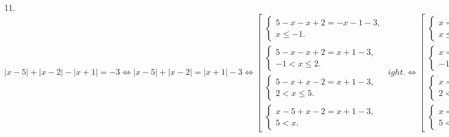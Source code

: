 11. $|x-5|+|x-2|-|x+1|=-3\Leftrightarrow |x-5|+|x-2|=|x+1|-3\Leftrightarrow \left[\begin{array}{l}\begin{cases} 5-x-x+2=-x-1-3,\\ x\leqslant-1.\end{cases}\\
\begin{cases} 5-x-x+2=x+1-3,\\ -1<x\leqslant2.\end{cases}\\ \begin{cases} 5-x+x-2=x+1-3,\\ 2<x\leqslant5.\end{cases}\\
\begin{cases} x-5+x-2=x+1-3,\\ 5< x.\end{cases}\end{array}
ight.\Leftrightarrow \left[\begin{array}{l}\begin{cases} x=11,\\ x\leqslant-1.\end{cases}\\
\begin{cases} x=3,\\ -1<x\leqslant2.\end{cases}\\ \begin{cases} x=5,\\ 2<x\leqslant5.\end{cases}\\
\begin{cases} x=5,\\ 5< x.\end{cases}\end{array}
ight.\Leftrightarrow x=5.$\\
